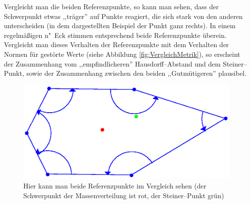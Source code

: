 Vergleicht man die beiden Referenzpunkte, so kann man sehen, dass der Schwerpunkt etwas ,,träger'' auf Punkte reagiert, die sich stark von den anderen unterscheiden (in dem dargestellten Beispiel der Punkt ganz rechts). In einem regelmäßigen n"~Eck stimmen entsprechend beide Referenzpunkte überein. Vergleicht man dieses Verhalten der Referenzpunkte mit dem Verhalten der Normen für gestörte Werte (siehe Abbildung \vref{fig:VergleichMetrik}), so erscheint der Zusammenhang vom ,,empfindlicheren'' Hausdorff--Abstand und dem  Steiner--Punkt, sowie der Zusammenhang zwischen den beiden ,,Gutmütigeren'' plausibel.

\begin{figure}
	\centering
	\includegraphics[scale=.8]{Referenzpunkte.eps}
	\caption[Vergleich beider Referenzpunkte]{Hier kann man beide Referenzpunkte im Vergleich sehen (der Schwerpunkt der Massenverteilung ist rot, der Steiner--Punkt grün) }
	\label{fig:Referenzpunkte}
\end{figure}


